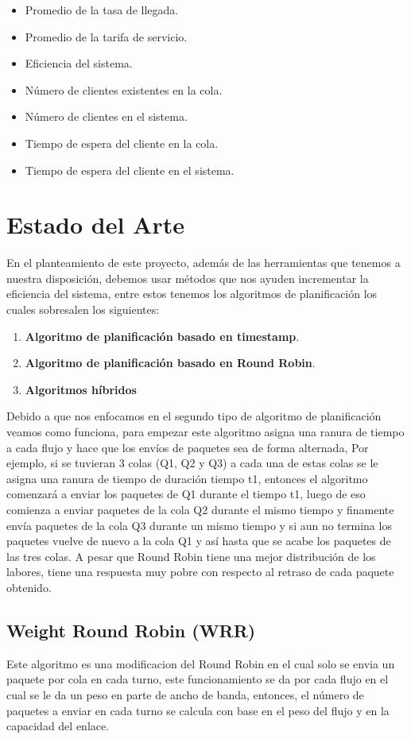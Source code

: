 \documentclass[conference,letterpaper]{IEEEtran}
\begin{document}
\begin{itemize}
    \item Promedio de la tasa de llegada.
    \item Promedio de la tarifa de servicio.
    \item Eficiencia del sistema.
    \item N\'umero de clientes existentes en la cola.
    \item N\'umero de clientes en el sistema.
    \item Tiempo de espera del cliente en la cola.
    \item Tiempo de espera del cliente en el sistema.
\end{itemize}

\section{Estado del Arte}
En el planteamiento de este proyecto, además de las herramientas que tenemos a nuestra disposición, debemos usar métodos que nos ayuden incrementar la eficiencia del sistema, entre estos tenemos los algoritmos de planificación los cuales sobresalen los siguientes:

\begin{enumerate}
    \item \textbf{Algoritmo de planificación basado en timestamp}.
    \item \textbf{Algoritmo de planificación basado en Round Robin}.
    \item \textbf{Algoritmos híbridos}
\end{enumerate}

Debido a que nos enfocamos en el segundo tipo de algoritmo de planificación veamos como funciona, para empezar este algoritmo asigna una ranura de tiempo a cada flujo y hace que los envíos de paquetes sea de forma alternada, Por ejemplo, si se tuvieran 3 colas (Q1, Q2 y Q3) a cada una de estas colas se le asigna una ranura de tiempo de duración tiempo t1, entonces el algoritmo comenzará a enviar los paquetes de Q1 durante el tiempo t1, luego de eso comienza a enviar paquetes de la cola Q2 durante el mismo tiempo y finamente envía paquetes de la cola Q3 durante un mismo tiempo y si aun no termina los paquetes vuelve de nuevo a la cola Q1 y así hasta que se acabe los paquetes de las tres colas. A pesar que Round Robin tiene una mejor distribución de los labores, tiene una respuesta muy pobre con respecto al retraso de cada paquete obtenido.

\subsection{Weight Round Robin (WRR)}
Este algoritmo es una modificacion del Round Robin en el cual solo se envia un paquete por cola en cada turno, este funcionamiento se da por cada flujo en el cual se le da un peso en parte de ancho de banda, entonces, el número de paquetes a enviar en cada turno se calcula con base en el peso del flujo y en la capacidad del enlace.
\end{document}
